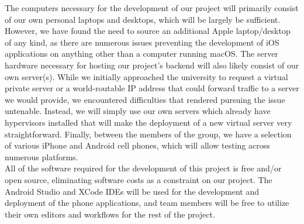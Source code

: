 \documentclass[11pt]{article}
\begin{document}
The computers necessary for the development of our project will primarily consist of our own personal laptops and desktops, which will be largely be sufficient. However, we have found the need to source an additional Apple laptop/desktop of any kind, as there are numerous issues preventing the development of iOS applications on anything other than a computer running macOS. The server hardware necessary for hosting our project’s backend will also likely consist of our own server(s). While we initially approached the university to request a virtual private server or a world-routable IP address that could forward traffic to a server we would provide, we encountered difficulties that rendered pursuing the issue untenable. Instead, we will simply use our own servers which already have hypervisors installed that will make the deployment of a new virtual server very straightforward. Finally, between the members of the group, we have a selection of various iPhone and Android cell phones, which will allow testing across numerous platforms.  \\

All of the software required for the development of this project is free and/or open source, eliminating software costs as a constraint on our project. The Android Studio and XCode IDEs will be used for the development and deployment of the phone applications, and team members will be free to utilize their own editors and workflows for the rest of the project.
\end{document}
